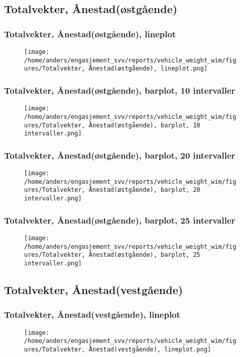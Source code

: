 \documentclass{article}
\begin{document}
\subsection{Totalvekter, Ånestad(østgående)}
\subsubsection{Totalvekter, Ånestad(østgående), lineplot}
\begin{figure}[H]
\centering
\texttt{[image: /home/anders/engasjement\_svv/reports/vehicle\_weight\_wim/figures/Totalvekter, Ånestad(østgående), lineplot.png]}
\end{figure}
\subsubsection{Totalvekter, Ånestad(østgående), barplot, 10 intervaller}
\begin{figure}[H]
\centering
\texttt{[image: /home/anders/engasjement\_svv/reports/vehicle\_weight\_wim/figures/Totalvekter, Ånestad(østgående), barplot, 10 intervaller.png]}
\end{figure}
\subsubsection{Totalvekter, Ånestad(østgående), barplot, 20 intervaller}
\begin{figure}[H]
\centering
\texttt{[image: /home/anders/engasjement\_svv/reports/vehicle\_weight\_wim/figures/Totalvekter, Ånestad(østgående), barplot, 20 intervaller.png]}
\end{figure}
\subsubsection{Totalvekter, Ånestad(østgående), barplot, 25 intervaller}
\begin{figure}[H]
\centering
\texttt{[image: /home/anders/engasjement\_svv/reports/vehicle\_weight\_wim/figures/Totalvekter, Ånestad(østgående), barplot, 25 intervaller.png]}
\end{figure}
\subsection{Totalvekter, Ånestad(vestgående)}
\subsubsection{Totalvekter, Ånestad(vestgående), lineplot}
\begin{figure}[H]
\centering
\texttt{[image: /home/anders/engasjement\_svv/reports/vehicle\_weight\_wim/figures/Totalvekter, Ånestad(vestgående), lineplot.png]}
\end{figure}
\end{document}

